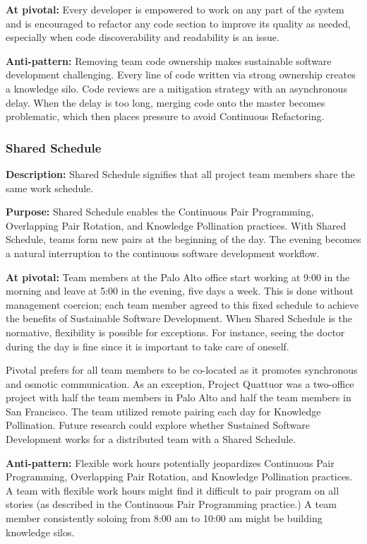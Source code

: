 \textbf{At pivotal:} Every developer is empowered to work on any part of the system and is encouraged to refactor any code section to improve its quality as needed, especially when code discoverability and readability is an issue.

\textbf{Anti-pattern:} Removing team code ownership makes sustainable software development challenging. Every line of code written via strong ownership creates a knowledge silo. Code reviews are a mitigation strategy with an asynchronous delay. When the delay is too long, merging code onto the master becomes problematic, which then places pressure to avoid Continuous Refactoring.  

\subsubsection{Shared Schedule}
\textbf{Description:} Shared Schedule signifies that all project team members share the same work schedule. 

\textbf{Purpose:} Shared Schedule enables the Continuous Pair Programming, Overlapping Pair Rotation, and Knowledge Pollination practices. With Shared Schedule, teams form new pairs at the beginning of the day. The evening becomes a natural interruption to the continuous software development workflow. 

\textbf{At pivotal:} Team members at the Palo Alto office start working at 9:00 in the morning and leave at 5:00 in the evening, five days a week. This is done without management coercion; each team member agreed to this fixed schedule to achieve the benefits of Sustainable Software Development. When Shared Schedule is the normative, flexibility is possible for exceptions. For instance, seeing the doctor during the day is fine since it is important to take care of oneself.

Pivotal prefers for all team members to be co-located as it promotes synchronous and osmotic communication. As an exception, Project Quattuor was a two-office project with half the team members in Palo Alto and half the team members in San Francisco. The team utilized remote pairing each day for Knowledge Pollination. Future research could explore whether Sustained Software Development works for a distributed team with a Shared Schedule.

\textbf{Anti-pattern:} Flexible work hours potentially jeopardizes Continuous Pair Programming, Overlapping Pair Rotation, and Knowledge Pollination practices. A team with flexible work hours might find it difficult to pair program on all stories (as described in the Continuous Pair Programming practice.) A team member consistently soloing from 8:00 am to 10:00 am might be building knowledge silos. 


